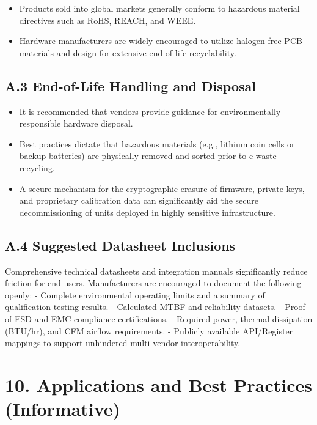 \documentclass[
]{article}
\begin{document}
\begin{itemize}
\item
  Products sold into global markets generally conform to hazardous
  material directives such as RoHS, REACH, and WEEE.
\item
  Hardware manufacturers are widely encouraged to utilize halogen-free
  PCB materials and design for extensive end-of-life recyclability.
\end{itemize}

\subsection{A.3 End-of-Life Handling and
Disposal}\label{a.3-end-of-life-handling-and-disposal}

\begin{itemize}
\item
  It is recommended that vendors provide guidance for environmentally
  responsible hardware disposal.
\item
  Best practices dictate that hazardous materials (e.g., lithium coin
  cells or backup batteries) are physically removed and sorted prior to
  e-waste recycling.
\item
  A secure mechanism for the cryptographic erasure of firmware, private
  keys, and proprietary calibration data can significantly aid the
  secure decommissioning of units deployed in highly sensitive
  infrastructure.
\end{itemize}

\subsection{A.4 Suggested Datasheet
Inclusions}\label{a.4-suggested-datasheet-inclusions}

Comprehensive technical datasheets and integration manuals significantly
reduce friction for end-users. Manufacturers are encouraged to document
the following openly: - Complete environmental operating limits and a
summary of qualification testing results. - Calculated MTBF and
reliability datasets. - Proof of ESD and EMC compliance certifications.
- Required power, thermal dissipation (BTU/hr), and CFM airflow
requirements. - Publicly available API/Register mappings to support
unhindered multi-vendor interoperability.

\section{10. Applications and Best Practices
(Informative)}\label{applications-and-best-practices-informative}
\end{document}
